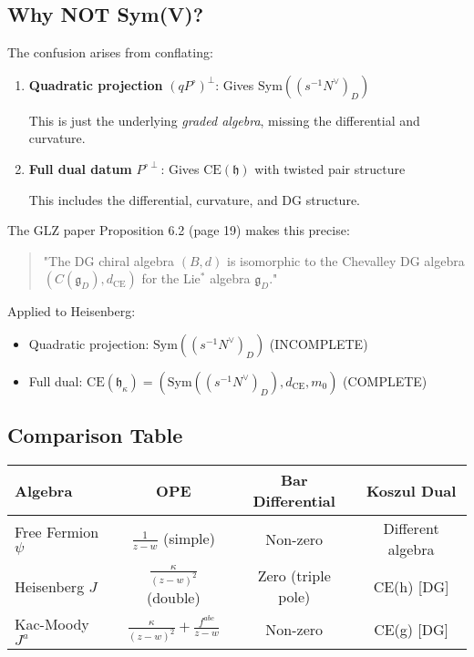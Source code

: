 \begin{example}
\subsection{Why NOT Sym(V)?}

The confusion arises from conflating:

\begin{enumerate}
\item \textbf{Quadratic projection} $(qP^\circ)^\perp$: Gives $\text{Sym}((s^{-1}N^\vee)_D)$
   
   This is just the underlying \emph{graded algebra}, missing the differential and curvature.

\item \textbf{Full dual datum} $P^{\circ\perp}$: Gives $\text{CE}(\mathfrak{h})$ with twisted pair structure
   
   This includes the differential, curvature, and DG structure.
\end{enumerate}

The GLZ paper \cite{GLZ-2212.11252v1} Proposition 6.2 (page 19) makes this precise:
\begin{quote}
"The DG chiral algebra $(B,d)$ is isomorphic to the Chevalley DG algebra $(C(\mathfrak{g}_D), d_{\text{CE}})$ for the Lie$^*$ algebra $\mathfrak{g}_D$."
\end{quote}

Applied to Heisenberg:
\begin{itemize}
\item Quadratic projection: $\text{Sym}((s^{-1}N^\vee)_D)$ (INCOMPLETE)
\item Full dual: $\text{CE}(\mathfrak{h}_\kappa) = (\text{Sym}((s^{-1}N^\vee)_D), d_{\text{CE}}, m_0)$ (COMPLETE)
\end{itemize}

\subsection{Comparison Table}

\begin{center}
\begin{tabular}{|l|c|c|c|}
\hline
\textbf{Algebra} & \textbf{OPE} & \textbf{Bar Differential} & \textbf{Koszul Dual} \\
\hline
Free Fermion $\psi$ & $\frac{1}{z-w}$ (simple) & Non-zero & Different algebra \\
Heisenberg $J$ & $\frac{\kappa}{(z-w)^2}$ (double) & Zero (triple pole) & CE(h) [DG] \\
Kac-Moody $J^a$ & $\frac{\kappa}{(z-w)^2} + \frac{f^{abc}}{z-w}$ & Non-zero & CE(g) [DG] \\
\hline
\end{tabular}
\end{center}


\end{example}
